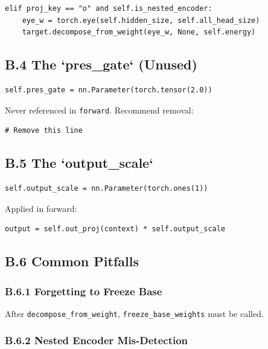 \begin{lstlisting}
elif proj_key == "o" and self.is_nested_encoder:
    eye_w = torch.eye(self.hidden_size, self.all_head_size)
    target.decompose_from_weight(eye_w, None, self.energy)
\end{lstlisting}

\subsection{B.4 The `pres\_gate` (Unused)}

\begin{lstlisting}
self.pres_gate = nn.Parameter(torch.tensor(2.0))
\end{lstlisting}

Never referenced in \texttt{forward}. Recommend removal:

\begin{lstlisting}
# Remove this line
\end{lstlisting}

\subsection{B.5 The `output\_scale`}

\begin{lstlisting}
self.output_scale = nn.Parameter(torch.ones(1))
\end{lstlisting}

Applied in forward:

\begin{lstlisting}
output = self.out_proj(context) * self.output_scale
\end{lstlisting}

\subsection{B.6 Common Pitfalls}

\subsubsection{B.6.1 Forgetting to Freeze Base}

After \texttt{decompose\_from\_weight}, \texttt{freeze\_base\_weights} must be called.

\subsubsection{B.6.2 Nested Encoder Mis-Detection}

